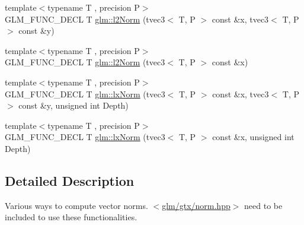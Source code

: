 \begin{DoxyCompactItemize}
{\footnotesize template$<$typename T , precision P$>$ }\\G\-L\-M\-\_\-\-F\-U\-N\-C\-\_\-\-D\-E\-C\-L T \hyperlink{group__gtx__norm_gafa6fbbc99cd44d81bf030e74eaf7ad64}{glm\-::l2\-Norm} (tvec3$<$ T, P $>$ const \&x, tvec3$<$ T, P $>$ const \&y)
\item 
{\footnotesize template$<$typename T , precision P$>$ }\\G\-L\-M\-\_\-\-F\-U\-N\-C\-\_\-\-D\-E\-C\-L T \hyperlink{group__gtx__norm_ga0a8cb8a0ce88d1d977de23209bf04610}{glm\-::l2\-Norm} (tvec3$<$ T, P $>$ const \&x)
\item 
{\footnotesize template$<$typename T , precision P$>$ }\\G\-L\-M\-\_\-\-F\-U\-N\-C\-\_\-\-D\-E\-C\-L T \hyperlink{group__gtx__norm_ga932bb0854e5c5a6ab5a14b023c451ca7}{glm\-::lx\-Norm} (tvec3$<$ T, P $>$ const \&x, tvec3$<$ T, P $>$ const \&y, unsigned int Depth)
\item 
{\footnotesize template$<$typename T , precision P$>$ }\\G\-L\-M\-\_\-\-F\-U\-N\-C\-\_\-\-D\-E\-C\-L T \hyperlink{group__gtx__norm_gaab931b0d1acfe2f9c1cb78311edf24fc}{glm\-::lx\-Norm} (tvec3$<$ T, P $>$ const \&x, unsigned int Depth)
\end{DoxyCompactItemize}


\subsection{Detailed Description}
Various ways to compute vector norms. $<$\hyperlink{norm_8hpp}{glm/gtx/norm.\-hpp}$>$ need to be included to use these functionalities. 

